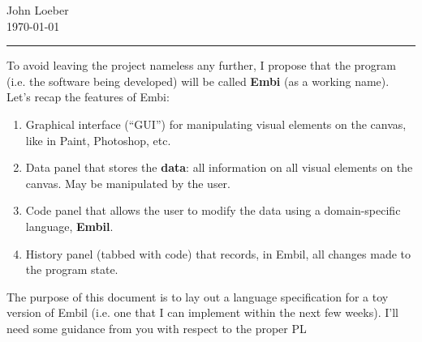 \documentclass[12pt]{article}
\theoremstyle{remark}
\begin{document}
\hfill John Loeber\\
 \hfill \today
\vspace{1.2pt}
\hrule
\vspace*{1.8mm}
$$$$
\noindent 
To avoid leaving the project nameless any further, I propose that the program (i.e. the software being developed) will be called \textbf{Embi} (as a working name). Let's recap the features of Embi:
\begin{enumerate}
\item Graphical interface (``GUI'') for manipulating visual elements on the canvas, like in Paint, Photoshop, etc.
\item Data panel that stores the \textbf{data}: all information on all visual elements on the canvas. May be manipulated by the user.
\item Code panel that allows the user to modify the data using a domain-specific language, \textbf{Embil}.
\item History panel (tabbed with code) that records, in Embil, all changes made to the program state.
\end{enumerate}

\noindent
The purpose of this document is to lay out a language specification for a toy version of Embil (i.e. one that I can implement within the next few weeks). I'll need some guidance from you with respect to the proper PL 
\end{document}
